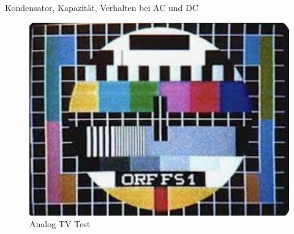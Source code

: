 


\begin{frame}{Kondensator, Kapazität, Verhalten bei AC und DC}




\begin{figure}
\centering
\includegraphics[scale=0.3]{grafik/b1.jpg}
\caption{Analog TV Test}
\end{figure}
\blindtext



\end{frame}

  